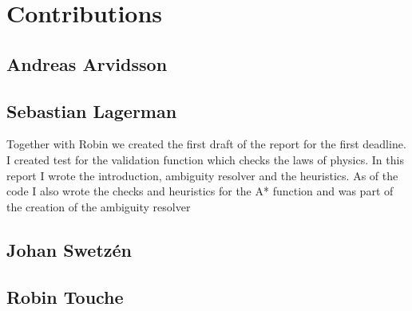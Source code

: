\section*{Contributions}
\subsection*{Andreas Arvidsson}
\subsection*{Sebastian Lagerman}
Together with Robin we created the first draft of the report for the first deadline.
I created test for the validation function which checks the laws of physics.
In this report I wrote the introduction, ambiguity resolver and the heuristics.
As of the code I also wrote the checks and heuristics for the A* function and was part of the creation of the ambiguity resolver
\subsection*{Johan Swetz\'en}
\subsection*{Robin Touche}
